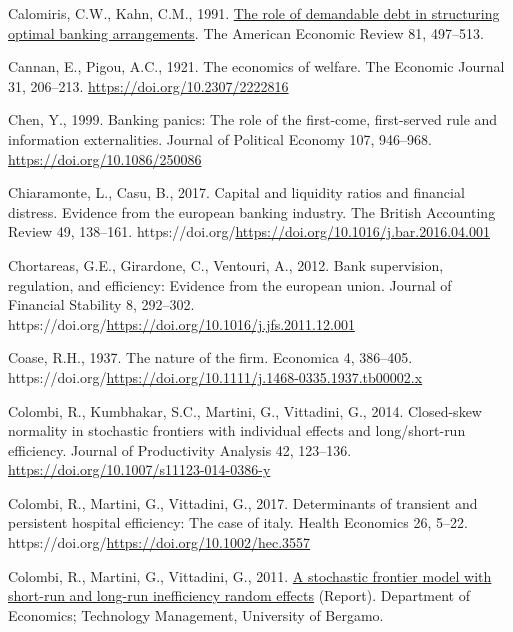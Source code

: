 \documentclass[
  letterpaper,
  DIV=11,
  numbers=noendperiod]{scrreprt}
\newlength{\cslhangindent}
\newenvironment{CSLReferences}[2] %
 {\begin{list}{}{%
  \setlength{\itemindent}{0pt}
  \setlength{\leftmargin}{0pt}
  \setlength{\parsep}{0pt}
  \ifodd #1
   \setlength{\leftmargin}{\cslhangindent}
   \setlength{\itemindent}{-1\cslhangindent}
  \fi
  \setlength{\itemsep}{#2\baselineskip}}}
 {\end{list}}
\begin{document}
\begin{CSLReferences}{1}{0}
Calomiris, C.W., Kahn, C.M., 1991.
\href{http://www.jstor.org/stable/2006515}{The role of demandable debt
in structuring optimal banking arrangements}. The American Economic
Review 81, 497--513.

Cannan, E., Pigou, A.C., 1921. The economics of welfare. The Economic
Journal 31, 206--213. \url{https://doi.org/10.2307/2222816}

Chen, Y., 1999. Banking panics: The role of the first-come, first-served
rule and information externalities. Journal of Political Economy 107,
946--968. \url{https://doi.org/10.1086/250086}

Chiaramonte, L., Casu, B., 2017. Capital and liquidity ratios and
financial distress. Evidence from the european banking industry. The
British Accounting Review 49, 138--161.
https://doi.org/\url{https://doi.org/10.1016/j.bar.2016.04.001}

Chortareas, G.E., Girardone, C., Ventouri, A., 2012. Bank supervision,
regulation, and efficiency: Evidence from the european union. Journal of
Financial Stability 8, 292--302.
https://doi.org/\url{https://doi.org/10.1016/j.jfs.2011.12.001}

Coase, R.H., 1937. The nature of the firm. Economica 4, 386--405.
https://doi.org/\url{https://doi.org/10.1111/j.1468-0335.1937.tb00002.x}

Colombi, R., Kumbhakar, S.C., Martini, G., Vittadini, G., 2014.
Closed-skew normality in stochastic frontiers with individual effects
and long/short-run efficiency. Journal of Productivity Analysis 42,
123--136. \url{https://doi.org/10.1007/s11123-014-0386-y}

Colombi, R., Martini, G., Vittadini, G., 2017. Determinants of transient
and persistent hospital efficiency: The case of italy. Health Economics
26, 5--22. https://doi.org/\url{https://doi.org/10.1002/hec.3557}

Colombi, R., Martini, G., Vittadini, G., 2011.
\href{https://EconPapers.repec.org/RePEc:brh:wpaper:1101}{A stochastic
frontier model with short-run and long-run inefficiency random effects}
(Report). Department of Economics; Technology Management, University of
Bergamo.


\end{CSLReferences}
\end{document}
